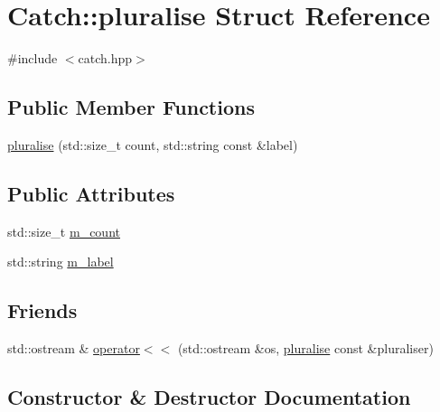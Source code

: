 \hypertarget{struct_catch_1_1pluralise}{}\section{Catch\+:\+:pluralise Struct Reference}
\label{struct_catch_1_1pluralise}


{\ttfamily \#include $<$catch.\+hpp$>$}

\subsection*{Public Member Functions}
\begin{DoxyCompactItemize}
\item 
\mbox{\hyperlink{struct_catch_1_1pluralise_a5c55e22de2416cfe416edf715c6b9234}{pluralise}} (std\+::size\+\_\+t count, std\+::string const \&label)
\end{DoxyCompactItemize}
\subsection*{Public Attributes}
\begin{DoxyCompactItemize}
\item 
std\+::size\+\_\+t \mbox{\hyperlink{struct_catch_1_1pluralise_a4dce2fa13ec6f00fac09b2418265441e}{m\+\_\+count}}
\item 
std\+::string \mbox{\hyperlink{struct_catch_1_1pluralise_a8849cbdd3f11ebe7747597c8644e8793}{m\+\_\+label}}
\end{DoxyCompactItemize}
\subsection*{Friends}
\begin{DoxyCompactItemize}
\item 
std\+::ostream \& \mbox{\hyperlink{struct_catch_1_1pluralise_aa7dac6b165514c1f85e0695d678fdef5}{operator$<$$<$}} (std\+::ostream \&os, \mbox{\hyperlink{struct_catch_1_1pluralise}{pluralise}} const \&pluraliser)
\end{DoxyCompactItemize}


\subsection{Constructor \& Destructor Documentation}
\mbox{\label{struct_catch_1_1pluralise_a5c55e22de2416cfe416edf715c6b9234}} 
